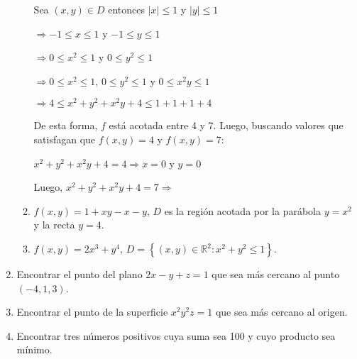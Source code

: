 \documentclass[fleqn, 12pt]{article}
\begin{document}
\begin{enumerate}
\begin{enumerate}
            Sea $ (x,y) \in D $ entonces $ \lvert x \rvert \leq 1 $ y $ \lvert y \rvert \leq 1 $

            $ \Longrightarrow -1 \leq x \leq 1 $ y $ -1 \leq y \leq 1 $

            $ \Longrightarrow 0 \leq x^2 \leq 1 $ y $ 0 \leq y^2 \leq 1 $

            $ \Longrightarrow 0 \leq x^2 \leq 1 $, $ 0 \leq y^2 \leq 1 $ y $ 0 \leq x^2 y \leq 1 $

            $ \Longrightarrow 4 \leq x^2 + y^2 + x^2 y + 4 \leq 1 + 1 + 1 + 4 $

            De esta forma, $ f $ está acotada entre 4 y 7. Luego, buscando valores que satisfagan que $ f(x,y) = 4 $ y $ f(x,y) = 7 $:

            $ x^2 + y^2 + x^2 y + 4 = 4 \Longrightarrow x = 0 $ y $ y = 0 $
            
            Luego, $ x^2 + y^2 + x^2 y + 4 = 7 \Longrightarrow $

            \item $ f(x,y) = 1 + xy - x - y, \, D $ es la región acotada por la parábola $ y = x^2 $ y la recta $ y = 4 $.
            

            \item $ f(x,y) = 2x^3 + y^4, \, D = \left\lbrace (x,y) \in \mathbb{R}^2 : x^2 + y^2 \leq 1 \right\rbrace $.
            
        \end{enumerate}
        \item Encontrar el punto del plano $ 2x - y + z = 1 $ que sea más cercano al punto $ (-4,1,3) $.
        

        \item Encontrar el punto de la superficie $ x^2 y^2 z = 1 $ que sea más cercano al origen.
        
        
        \item Encontrar tres números positivos cuya suma sea 100 y cuyo producto sea mínimo.
    


\end{enumerate}
\end{document}
